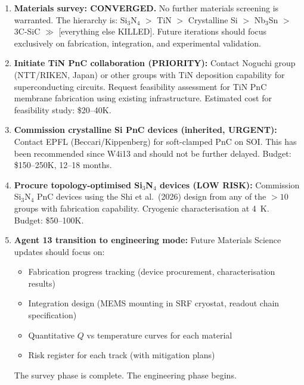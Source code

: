 \documentclass[11pt]{article}
\theoremstyle{definition}
\theoremstyle{remark}
\begin{document}
\begin{enumerate}[nosep]
\item \textbf{Materials survey: CONVERGED.} No further materials
  screening is warranted. The hierarchy is:
  Si$_3$N$_4$ $>$ TiN $>$ Crystalline Si $>$ Nb$_3$Sn $>$
  3C-SiC $\gg$ [everything else KILLED].
  Future iterations should focus exclusively on fabrication,
  integration, and experimental validation.

\item \textbf{Initiate TiN PnC collaboration (PRIORITY):}
  Contact Noguchi group (NTT/RIKEN, Japan) or other groups with
  TiN deposition capability for superconducting circuits. Request
  feasibility assessment for TiN PnC membrane fabrication using
  existing infrastructure. Estimated cost for feasibility study:
  \$20--40K.

\item \textbf{Commission crystalline Si PnC devices (inherited,
  URGENT):} Contact EPFL (Beccari/Kippenberg) for soft-clamped
  PnC on SOI. This has been recommended since W4i13 and should
  not be further delayed. Budget: \$150--250K, 12--18 months.

\item \textbf{Procure topology-optimised Si$_3$N$_4$ devices
  (LOW RISK):} Commission Si$_3$N$_4$ PnC devices using the
  Shi et al.\ (2026) design from any of the $> 10$ groups with
  fabrication capability. Cryogenic characterisation at 4~K.
  Budget: \$50--100K.

\item \textbf{Agent 13 transition to engineering mode:} Future
  Materials Science updates should focus on:
  \begin{itemize}[nosep]
  \item Fabrication progress tracking (device procurement,
    characterisation results)
  \item Integration design (MEMS mounting in SRF cryostat,
    readout chain specification)
  \item Quantitative $Q$ vs temperature curves for each material
  \item Risk register for each track (with mitigation plans)
  \end{itemize}
  The survey phase is complete. The engineering phase begins.
\end{enumerate}
\end{document}
